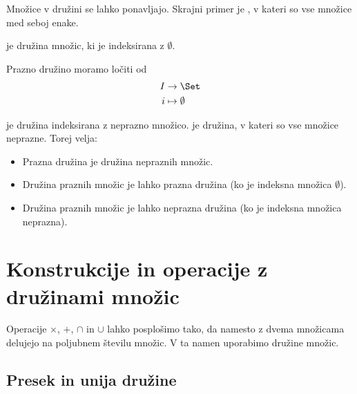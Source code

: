 \begin{zgled}
  Množice v družini se lahko ponavljajo. Skrajni primer je , v kateri so vse množice med seboj enake.
\end{zgled}

\begin{zgled}
   je družina množic, ki je indeksirana z $\emptyset$.
\end{zgled}

\begin{zgled}
  Prazno družino moramo ločiti od 
  \begin{align*}
    I &\to \Set \\
    i &\mapsto \emptyset
  \end{align*}
\end{zgled}

\begin{zgled}
   je družina indeksirana z neprazno množico.
   je družina, v kateri so vse množice neprazne.
  Torej velja:
  \begin{itemize}
  \item Prazna družina je družina nepraznih množic.
  \item Družina praznih množic je lahko prazna družina (ko je indeksna množica $\emptyset$).
  \item Družina praznih množic je lahko neprazna družina (ko je indeksna množica neprazna).
  \end{itemize}
\end{zgled}


\section{Konstrukcije in operacije z družinami množic}

Operacije $\times$, $+$, $\cap$ in $\cup$ lahko posplošimo tako, da namesto z dvema
množicama delujejo na poljubnem številu množic. V ta namen uporabimo družine
množic.

\subsection{Presek in unija družine}

